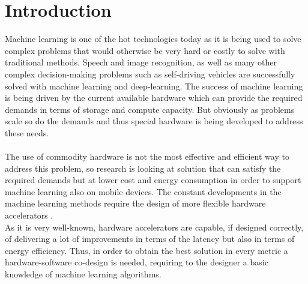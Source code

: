 \chapter{Introduction}
Machine learning is one of the hot technologies today as it is being used to solve complex problems that would otherwise be very hard or costly to solve with traditional methods. Speech and image recognition, as well as many other complex decision-making problems such as self-driving vehicles are successfully solved with machine learning and deep-learning. 
The success of machine learning is being driven by the current available hardware which can provide the required demands in terms of storage and compute capacity. But obviously as problems scale so do the demands and thus special hardware is being developed to address these needs. \\\\
The use of commodity hardware is not the most effective and efficient way to address this problem, so research is looking at solution that can satisfy the required demands but at lower cost and energy consumption in order to support machine learning also on mobile devices.
The constant developments in the machine learning methods require the design of more flexible hardware accelerators \cite{paper:1} \cite{paper:2}.\\
As it is very well-known, hardware accelerators are capable, if designed correctly, of delivering a lot of improvements in terms of the latency but also in terms of energy efficiency\cite{paper:29}. Thus, in order to obtain the best solution in every metric a hardware-software co-design is needed, requiring to the designer a basic knowledge of machine learning algorithms.\\\\

